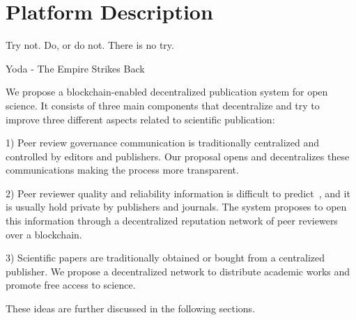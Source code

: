\chapter{Platform Description}

\begin{FraseCelebre}
  \begin{Frase}
    Try not. Do, or do not. There is no try.
  \end{Frase}
  \begin{Fuente}
    Yoda - The Empire Strikes Back
  \end{Fuente}
\end{FraseCelebre}

We propose a blockchain-enabled decentralized publication system for open
science. It consists of three main components that decentralize and try to
improve three different aspects related to scientific publication:

1) Peer review governance communication is traditionally centralized and
controlled by editors and publishers. Our proposal opens and decentralizes these
communications making the process more transparent.

2) Peer reviewer quality and reliability information is difficult to
predict~\cite{callaham_relationship_2007}, and it is usually hold private by
publishers and journals. The system proposes to open this information through a
decentralized reputation network of peer reviewers over a blockchain.

3) Scientific papers are traditionally obtained or bought from a centralized
publisher. We propose a decentralized network to distribute academic works and
promote free access to science.

These ideas are further discussed in the following sections.




